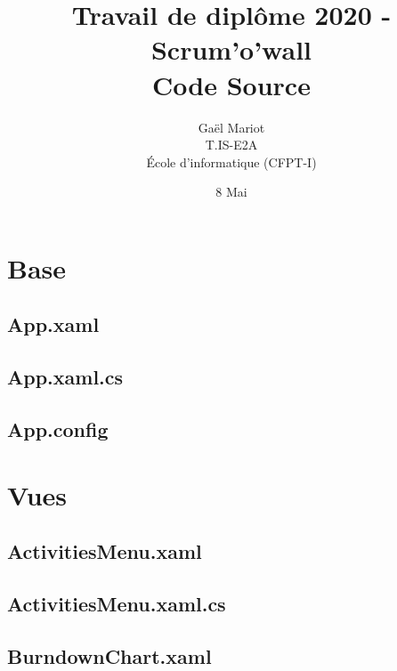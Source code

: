 \documentclass[a4paper,11pt]{article}
\begin{document}
	\title{Travail de diplôme 2020 - Scrum'o'wall \\ Code Source}
	\author{Gaël Mariot \\ T.IS-E2A \\ École d'informatique (CFPT-I)}
	\date{8 Mai}
	\maketitle

\newpage

\tableofcontents
\newcommand{\mylstinputlisting}[1]{}
			
\newpage
\section{Base}
\subsection{App.xaml}
\mylstinputlisting{../../Scrum'o'wall/Scrum'o'wall/App.xaml}
\subsection{App.xaml.cs}
\mylstinputlisting{../../Scrum'o'wall/Scrum'o'wall/App.xaml.cs}
\subsection{App.config}
\mylstinputlisting{../../Scrum'o'wall/Scrum'o'wall/App.config}

\newpage

\section{Vues}
\subsection{ActivitiesMenu.xaml}
\mylstinputlisting{../../Scrum'o'wall/Scrum'o'wall/Views/ActivitiesMenu.xaml}
\subsection{ActivitiesMenu.xaml.cs}
\mylstinputlisting{../../Scrum'o'wall/Scrum'o'wall/Views/ActivitiesMenu.xaml.cs}
\subsection{BurndownChart.xaml}
\mylstinputlisting{../../Scrum'o'wall/Scrum'o'wall/Views/BurndownChart.xaml}
\end{document}
